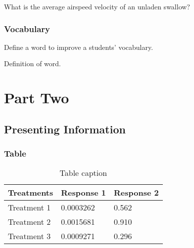 \documentclass[11pt,fleqn]{book} %
\begin{document}
\begin{problem}
What is the average airspeed velocity of an unladen swallow?
\end{problem}


\section{Vocabulary}

Define a word to improve a students' vocabulary.

\begin{vocabulary}[Word]
Definition of word.
\end{vocabulary}


\part{Part Two}



\chapter{Presenting Information}

\section{Table}

\begin{table}[h]
\centering
\begin{tabular}{l l l}
\toprule
\textbf{Treatments} & \textbf{Response 1} & \textbf{Response 2}\\
\midrule
Treatment 1 & 0.0003262 & 0.562 \\
Treatment 2 & 0.0015681 & 0.910 \\
Treatment 3 & 0.0009271 & 0.296 \\
\bottomrule
\end{tabular}
\caption{Table caption}
\end{table}
\end{document}
